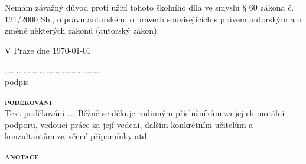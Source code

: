 \documentclass[12pt,a4paper]{article} %
\begin{document}
{Nemám závažný důvod proti užití tohoto školního díla ve smyslu § 60 zákona č. 121/2000 Sb., o právu autorském, o právech souvisejících s právem autorským a o změně některých zákonů (autorský zákon).}\\[0.5cm]

\begin{minipage}{0.49\textwidth}
\begin{flushleft}
{V Praze dne \today}\\%
\bigskip
\bigskip
\end{flushleft}
\end{minipage}
\begin{minipage}{0.49\textwidth}
\begin{flushright}
\centering
{
..........................................\\
podpis
}
\end{flushright}
\end{minipage}

\newpage
\textsc{\textbf{\fontsize{20pt}{0}\selectfont poděkování}}\\

{\color{red} Text poděkování …. Běžně se děkuje rodinným příslušníkům za jejich morální podporu, vedoucí práce za její vedení, dalším konkrétním učitelům a konzultantům za věcné připomínky atd.}

\newpage
\textsc{\textbf{\fontsize{20pt}{0}\selectfont anotace}}\\
\end{document}
